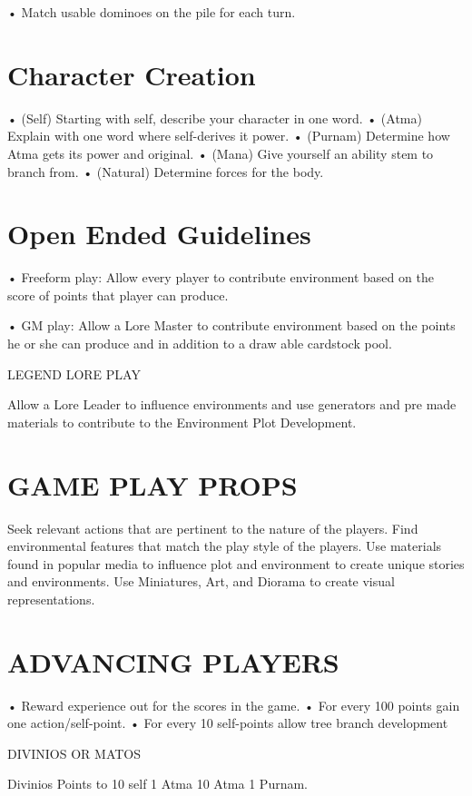\documentclass{article}
\begin{document}
• Match usable dominoes on the pile for each turn.

\section{Character Creation}

• (Self) Starting with self, describe your character in one word.
• (Atma) Explain with one word where self-derives it power.
• (Purnam) Determine how Atma gets its power and original.
• (Mana) Give yourself an ability stem to branch from.
• (Natural) Determine forces for the body.

\section{Open Ended Guidelines}

• Freeform play:
Allow every player to contribute environment based on the score of points that player can
produce.

• GM play:
Allow a Lore Master to contribute environment based on the points he or she can produce and in
addition to a draw able cardstock pool.

LEGEND LORE PLAY

Allow a Lore Leader to influence environments and use generators and pre made materials to
contribute to the Environment Plot Development.

\section{GAME PLAY PROPS}

Seek relevant actions that are pertinent to the nature of the players. Find environmental features
that match the play style of the players. Use materials found in popular media to influence plot
and environment to create unique stories and environments. Use Miniatures, Art, and Diorama to
create visual representations.

\section{ADVANCING PLAYERS}

• Reward experience out for the scores in the game.
• For every 100 points gain one action/self-point.
• For every 10 self-points allow tree branch development

DIVINIOS OR MATOS

Divinios Points to 10 self 1 Atma 10 Atma 1 Purnam.
\end{document}
